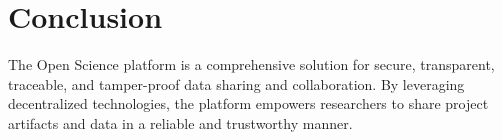 \documentclass{article}
\begin{document}
\section{Conclusion}
The Open Science platform is a comprehensive solution for secure, transparent, traceable, and tamper-proof data sharing and collaboration. By leveraging decentralized technologies, the platform empowers researchers to share project artifacts and data in a reliable and trustworthy manner.
\end{document}
